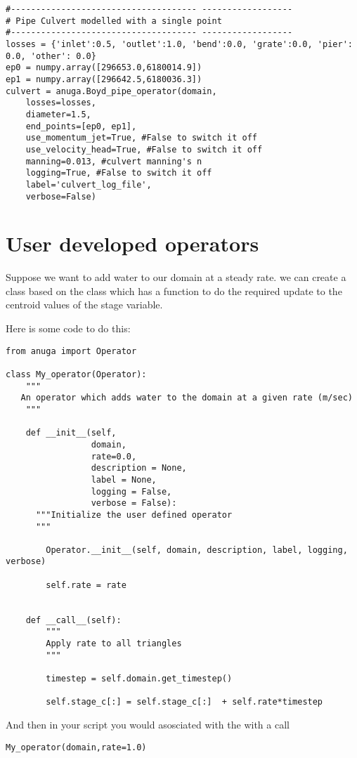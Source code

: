 \documentclass{manual}
\begin{document}
\begin{verbatim}
#------------------------------------- ------------------
# Pipe Culvert modelled with a single point
#------------------------------------- ------------------
losses = {'inlet':0.5, 'outlet':1.0, 'bend':0.0, 'grate':0.0, 'pier': 0.0, 'other': 0.0}
ep0 = numpy.array([296653.0,6180014.9])
ep1 = numpy.array([296642.5,6180036.3])
culvert = anuga.Boyd_pipe_operator(domain,
    losses=losses,
    diameter=1.5,
    end_points=[ep0, ep1],
    use_momentum_jet=True, #False to switch it off
    use_velocity_head=True, #False to switch it off
    manning=0.013, #culvert manning's n
    logging=True, #False to switch it off
    label='culvert_log_file',
    verbose=False)
\end{verbatim}

\section{User developed operators}

Suppose we want to add water to our domain at a steady rate. we can create a class based on the  class which has a  function to do the required update to the centroid values of the stage variable.

Here is some code to do this:
\begin{verbatim}
from anuga import Operator

class My_operator(Operator):
    """
   An operator which adds water to the domain at a given rate (m/sec)
    """

    def __init__(self,
                 domain,
                 rate=0.0,
                 description = None,
                 label = None,
                 logging = False,
                 verbose = False):
	  """Initialize the user defined operator
	  """

        Operator.__init__(self, domain, description, label, logging, verbose)

        self.rate = rate


    def __call__(self):
        """
        Apply rate to all triangles
        """

        timestep = self.domain.get_timestep()

        self.stage_c[:] = self.stage_c[:]  + self.rate*timestep
\end{verbatim}

And then in your script you would asosciated  with the  with a call
\begin{verbatim}
My_operator(domain,rate=1.0)
\end{verbatim}
\end{document}
